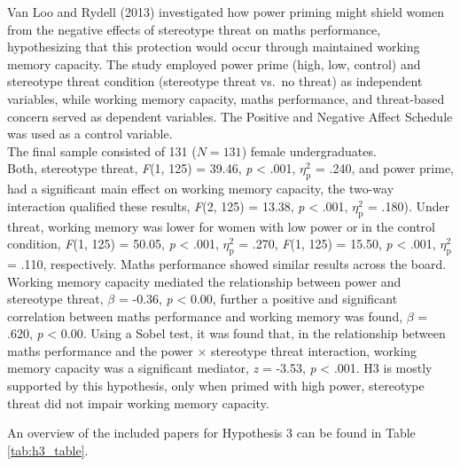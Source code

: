 \documentclass[
  stu, a4paper,floatsintext]{apa7}
\begin{document}
Van Loo and Rydell (2013) investigated how power priming might shield women from the negative effects of stereotype threat on maths performance, hypothesizing that this protection would occur through maintained working memory capacity.
The study employed power prime (high, low, control) and stereotype threat condition (stereotype threat vs.~no threat) as independent variables, while working memory capacity, maths performance, and threat-based concern served as dependent variables.
The Positive and Negative Affect Schedule was used as a control variable.\\
The final sample consisted of 131 (\(N = 131\)) female undergraduates.\\
Both, stereotype threat, \emph{F}(1, 125) = 39.46, \emph{p} \textless{} .001, \(\eta^{2}_{\text{p}}\) = .240, and power prime, had a significant main effect on working memory capacity, the two-way interaction qualified these results, \emph{F}(2, 125) = 13.38, \emph{p} \textless{} .001, \(\eta^{2}_{\text{p}}\) = .180).
Under threat, working memory was lower for women with low power or in the control condition, \emph{F}(1, 125) = 50.05, \emph{p} \textless{} .001, \(\eta^{2}_{\text{p}}\) = .270, \emph{F}(1, 125) = 15.50, \emph{p} \textless{} .001, \(\eta^{2}_{\text{p}}\) = .110, respectively.
Maths performance showed similar results across the board.
Working memory capacity mediated the relationship between power and stereotype threat, \(\beta\) = -0.36, \emph{p} \textless{} 0.00, further a positive and significant correlation between maths performance and working memory was found, \(\beta\) = .620, \emph{p} \textless{} 0.00.
Using a Sobel test, it was found that, in the relationship between maths performance and the power \(\times\) stereotype threat interaction, working memory capacity was a significant mediator, \emph{z} = -3.53, \emph{p} \textless{} .001.
H3 is mostly supported by this hypothesis, only when primed with high power, stereotype threat did not impair working memory capacity.

An overview of the included papers for Hypothesis 3 can be found in Table \ref{tab:h3_table}.
\end{document}
